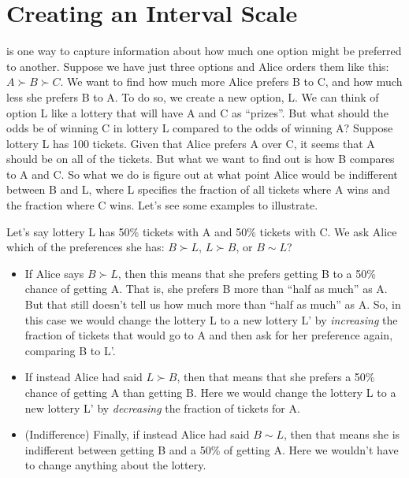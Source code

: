 \documentclass[]{tufte-book}
\begin{document}
\hypertarget{creating-an-interval-scale}{%
\section{Creating an Interval Scale}\label{creating-an-interval-scale}}

 is one way to capture information about how much one option might be preferred to another. Suppose we have just three options and Alice orders them like this: \(A\succ B \succ C\). We want to find how much more Alice prefers B to C, and how much less she prefers B to A. To do so, we create a new option, L. We can think of option L like a lottery that will have A and C as ``prizes''. But what should the odds be of winning C in lottery L compared to the odds of winning A? Suppose lottery L has 100 tickets. Given that Alice prefers A over C, it seems that A should be on all of the tickets. But what we want to find out is how B compares to A and C. So what we do is figure out at what point Alice would be indifferent between B and L, where L specifies the fraction of all tickets where A wins and the fraction where C wins. Let's see some examples to illustrate.

Let's say lottery L has 50\% tickets with A and 50\% tickets with C. We ask Alice which of the preferences she has: \(B\succ L\), \(L\succ B\), or \(B\sim L\)?

\begin{itemize}
\item
  If Alice says \(B\succ L\), then this means that she prefers getting B to a 50\% chance of getting A. That is, she prefers B more than ``half as much'' as A. But that still doesn't tell us how much more than ``half as much'' as A. So, in this case we would change the lottery L to a new lottery L' by \emph{increasing} the fraction of tickets that would go to A and then ask for her preference again, comparing B to L'.
\item
  If instead Alice had said \(L\succ B\), then that means that she prefers a 50\% chance of getting A than getting B. Here we would change the lottery L to a new lottery L' by \emph{decreasing} the fraction of tickets for A.
\item
  (Indifference) Finally, if instead Alice had said \(B\sim L\), then that means she is indifferent between getting B and a 50\% of getting A. Here we wouldn't have to change anything about the lottery.
\end{itemize}
\end{document}
